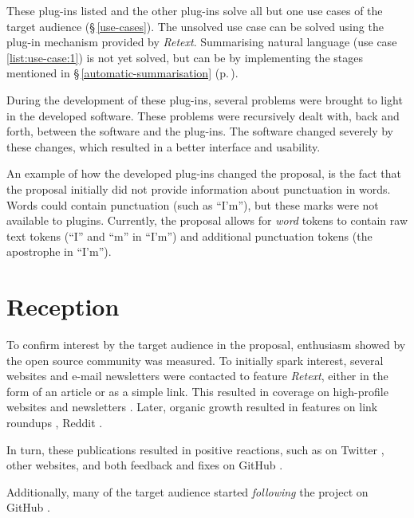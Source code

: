 \noindent These plug-ins listed and the other plug-ins solve all but one
  use cases of the target audience (§\,\ref{use-cases}).
The unsolved use case can be solved using the plug-in mechanism provided by
  \emph{Retext}.
Summarising natural language (use case \ref{list:use-case:1}) is not yet
  solved, but can be by implementing the stages mentioned in
  §\,\ref{automatic-summarisation} (p.\,\pageref{automatic-summarisation}).

During the development of these plug-ins, several problems were brought to
  light in the developed software.
These problems were recursively dealt with, back and forth, between the
  software and the plug-ins.
The software changed severely by these changes, which resulted in a
  better interface and usability.

An example of how the developed plug-ins changed the proposal, is the fact
  that the proposal initially did not provide information about punctuation
  in words.
Words could contain punctuation (such as ``I'm''), but these marks were not
  available to plugins.
Currently, the proposal allows for \emph{word} tokens to contain raw text
  tokens (``I'' and ``m'' in ``I'm'') and additional punctuation tokens (the
  apostrophe in ``I'm'').

\section{Reception}\label{reception}

To confirm interest by the target audience in the proposal, enthusiasm
  showed by the open source community was measured.
To initially spark interest, several websites and e-mail newsletters were
  contacted to feature \emph{Retext}, either in the form of an article or as
  a simple link.
This resulted in coverage on high-profile websites
  \autocite{dailyjs.com-natural-language-parsing-retext} and newsletters
  \autocites{nodeweekly.com-47}{javascriptweekly.com-193}
  {newspaper.io/javascript-2014-08-11}.
Later, organic growth resulted in features on link roundups
  \autocites{github.com-awesome-machine-learning}{github.com-awesome-nodejs},
  Reddit \autocites{reddit.com-mention-1}{reddit.com-mention-2}
  {reddit.com-mention-3}.

In turn, these publications resulted in positive reactions, such as on
  Twitter \autocites{twitter.com-mention-1}{twitter.com-mention-2}
  {twitter.com-mention-3}{twitter.com-mention-4}{twitter.com-mention-5}
  {twitter.com-mention-6}, other websites, and both feedback and fixes
  on GitHub \autocites{github.com-issue-1}{github.com-issue-2}
  {github.com-issue-3}{github.com-pull-request}.

Additionally, many of the target audience started \emph{following} the
  project on GitHub \autocite{github.com-stargazers}.
